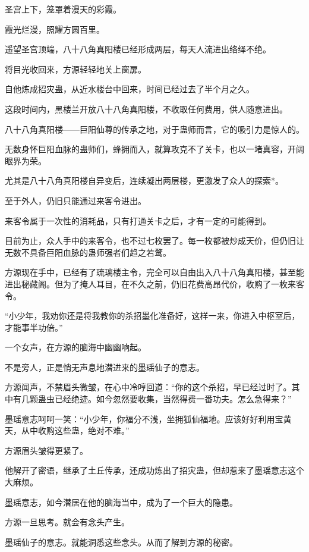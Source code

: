 
\begin{this_body}

圣宫上下，笼罩着漫天的彩霞。

霞光烂漫，照耀方圆百里。

遥望圣宫顶端，八十八角真阳楼已经形成两层，每天人流进出络绎不绝。

将目光收回来，方源轻轻地关上窗扉。

自他炼成招灾蛊，从近水楼台中回来，时间已经过去了半个月之久。

这段时间内，黑楼兰开放八十八角真阳楼，不收取任何费用，供人随意进出。

八十八角真阳楼——巨阳仙尊的传承之地，对于蛊师而言，它的吸引力是惊人的。

无数身怀巨阳血脉的蛊师们，蜂拥而入，就算攻克不了关卡，也以一堵真容，开阔眼界为荣。

尤其是八十八角真阳楼自异变后，连续凝出两层楼，更激发了众人的探索*。

至于外人，仍旧只能通过来客令进出。

来客令属于一次性的消耗品，只有打通关卡之后，才有一定的可能得到。

目前为止，众人手中的来客令，也不过七枚罢了。每一枚都被炒成天价，但仍旧让无数不具备巨阳血脉的蛊师强者们趋之若鹜。

方源现在手中，已经有了琉璃楼主令，完全可以自由出入八十八角真阳楼，甚至能进出秘藏阁。但为了掩人耳目，在不久之前，仍旧花费高昂代价，收购了一枚来客令。

“小少年，我劝你还是将我教你的杀招墨化准备好，这样一来，你进入中枢室后，才能事半功倍。”

一个女声，在方源的脑海中幽幽响起。

不是旁人，正是悄无声息地潜进来的墨瑶仙子的意志。

方源闻声，不禁眉头微皱，在心中冷哼回道：“你的这个杀招，早已经过时了。其中有几颗蛊虫已经绝迹。如今忽然要收集，当然得费一番功夫。怎么急得来？”

墨瑶意志呵呵一笑：“小少年，你福分不浅，坐拥狐仙福地。应该好好利用宝黄天，从中收购这些蛊，绝对不难。”

方源眉头皱得更紧了。

他解开了密语，继承了土丘传承，还成功炼出了招灾蛊，但却惹来了墨瑶意志这个大麻烦。

墨瑶意志，如今潜居在他的脑海当中，成为了一个巨大的隐患。

方源一旦思考。就会有念头产生。

墨瑶仙子的意志。就能洞悉这些念头。从而了解到方源的秘密。


\end{this_body}
